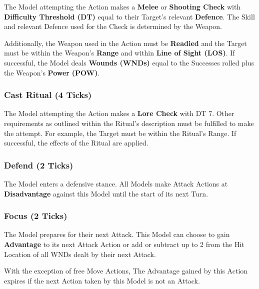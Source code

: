 \documentclass[
]{book}
\begin{document}
The Model attempting the Action makes a \textbf{Melee} or \textbf{Shooting Check} with \textbf{Difficulty Threshold (DT)} equal to their Target's relevant \textbf{Defence}. The Skill and relevant Defence used for the Check is determined by the Weapon.  

Additionally, the Weapon used in the Action must be \textbf{Readied} and the Target must be within the Weapon's \textbf{Range} and within \textbf{Line of Sight (LOS)}. If successful, the Model deals \textbf{Wounds (WNDs)} equal to the Successes rolled plus the Weapon's \textbf{Power} \textbf{(POW)}.   

\hypertarget{cast-ritual-4-ticks}{%
\subsubsection*{Cast Ritual (4 Ticks)}\label{cast-ritual-4-ticks}}

The Model attempting the Action makes a \textbf{Lore Check} with DT 7. Other requirements as outlined within the Ritual's description must be fulfilled to make the attempt. For example, the Target must be within the Ritual's Range. If successful, the effects of the Ritual are applied.

\hypertarget{defend-2-ticks}{%
\subsubsection*{Defend (2 Ticks)}\label{defend-2-ticks}}

The Model enters a defensive stance. All Models make Attack Actions at \textbf{Disadvantage} against this Model until the start of its next Turn.

\hypertarget{focus-2-ticks}{%
\subsubsection*{Focus (2 Ticks)}\label{focus-2-ticks}}

The Model prepares for their next Attack. This Model can choose to gain \textbf{Advantage} to its next Attack Action or add or subtract up to 2 from the Hit Location of all WNDs dealt by their next Attack.  

With the exception of free Move Actions, The Advantage gained by this Action expires if the next Action taken by this Model is not an Attack.
\end{document}
